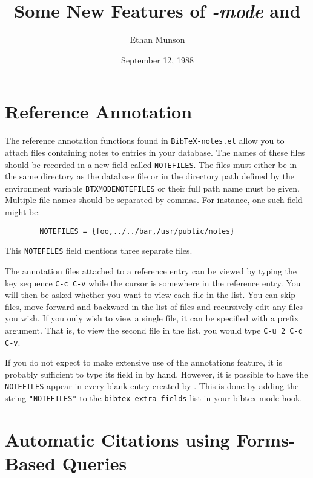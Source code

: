 



\title{Some New Features of {\sl {\Bbf}-mode} and {\TM}}
\author{Ethan Munson}
\date{September 12, 1988}
\maketitle

\section{Reference Annotation}

The reference annotation functions found in {\tt BibTeX-notes.el}
allow you to attach files containing notes to entries in your
{\BibTeX} database.  The names of these files should be recorded in a
new field called {\tt NOTEFILES}.  The files must either be in the
same directory as the {\BibTeX} database file or in the directory path
defined by the environment variable {\tt BTXMODENOTEFILES} or their
full path name must be given.  Multiple file names should be separated
by commas.  For instance, one such field might be:
\begin{verbatim}
        NOTEFILES = {foo,../../bar,/usr/public/notes}
\end{verbatim}
This {\tt NOTEFILES} field mentions three separate files.

The annotation files attached to a reference entry can be viewed by
typing the key sequence \verb+C-c C-v+ while the cursor is somewhere
in the reference entry. You will then be asked whether you want to
view each file in the list.  You can skip files, move forward and
backward in the list of files and recursively edit any files you wish.
If you only wish to view a single file, it can be specified with a
prefix argument.  That is, to view the second file in the list, you
would type \verb+C-u 2 C-c C-v+.

If you do not expect to make extensive use of the annotations feature,
it is probably sufficient to type its field in by hand.  However, it
is possible to have the {\tt NOTEFILES} appear in every blank entry
created by {\BM}.  This is done by adding the string
\verb+"NOTEFILES"+ to the {\tt bibtex-extra-fields} list in your
bibtex-mode-hook.

\section{Automatic Citations using Forms-Based Queries}

